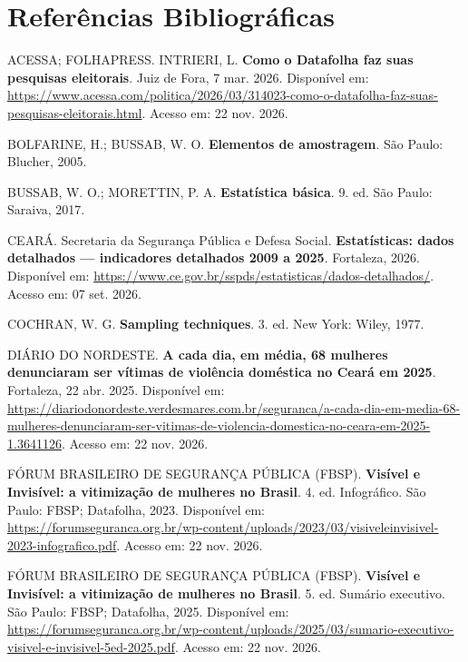 \documentclass[12pt,a4paper]{article}
\begin{document}
\newpage

\section{Referências Bibliográficas}

\begin{description}
\item ACESSA; FOLHAPRESS. INTRIERI, L. \textbf{Como o Datafolha faz suas pesquisas eleitorais}. Juiz de Fora, 7 mar. 2026. Disponível em: \url{https://www.acessa.com/politica/2026/03/314023-como-o-datafolha-faz-suas-pesquisas-eleitorais.html}. Acesso em: 22 nov. 2026.

\item BOLFARINE, H.; BUSSAB, W. O. \textbf{Elementos de amostragem}. São Paulo: Blucher, 2005.

\item BUSSAB, W. O.; MORETTIN, P. A. \textbf{Estatística básica}. 9. ed. São Paulo: Saraiva, 2017.

\item CEARÁ. Secretaria da Segurança Pública e Defesa Social. \textbf{Estatísticas: dados detalhados --- indicadores detalhados 2009 a 2025}. Fortaleza, 2026. Disponível em: \url{https://www.ce.gov.br/sspds/estatisticas/dados-detalhados/}. Acesso em: 07 set. 2026.

\item COCHRAN, W. G. \textbf{Sampling techniques}. 3. ed. New York: Wiley, 1977.

\item DIÁRIO DO NORDESTE. \textbf{A cada dia, em média, 68 mulheres denunciaram ser vítimas de violência doméstica no Ceará em 2025}. Fortaleza, 22 abr. 2025. Disponível em: \url{https://diariodonordeste.verdesmares.com.br/seguranca/a-cada-dia-em-media-68-mulheres-denunciaram-ser-vitimas-de-violencia-domestica-no-ceara-em-2025-1.3641126}. Acesso em: 22 nov. 2026.

\item FÓRUM BRASILEIRO DE SEGURANÇA PÚBLICA (FBSP). \textbf{Visível e Invisível: a vitimização de mulheres no Brasil}. 4. ed. Infográfico. São Paulo: FBSP; Datafolha, 2023. Disponível em: \url{https://forumseguranca.org.br/wp-content/uploads/2023/03/visiveleinvisivel-2023-infografico.pdf}. Acesso em: 22 nov. 2026.

\item FÓRUM BRASILEIRO DE SEGURANÇA PÚBLICA (FBSP). \textbf{Visível e Invisível: a vitimização de mulheres no Brasil}. 5. ed. Sumário executivo. São Paulo: FBSP; Datafolha, 2025. Disponível em: \url{https://forumseguranca.org.br/wp-content/uploads/2025/03/sumario-executivo-visivel-e-invisivel-5ed-2025.pdf}. Acesso em: 22 nov. 2026.


\end{description}
\end{document}
